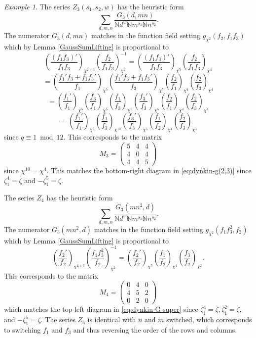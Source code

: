 \documentclass[11pt,letterpaper]{article}
\theoremstyle{definition}
\theoremstyle{remark}
\newtheorem{example}[theorem]{Example}
\numberwithin{equation}{section}
\theoremstyle{dotless}
\newcommand{\gene}{\zeta_1} %
\begin{document}
\begin{example}
The series $Z_3(s_1,s_2,w)$ has the heuristic form \[ \sum_{d,m,n} \frac{G_3(d,mn) }{ \mathbb N d^w \mathbb Nm^{s_1} \mathbb N n^{s_2} }.\] The numerator $G_3(d,mn)$ matches in the function field setting $g_{\chi^2} (f_2,f_1f_3)$ which by Lemma \ref{GaussSumLifting} is proportional to  \[\left( \frac{ (f_1f_3)'}{f_1f_3} \right)_{\chi^{2+3}}  \left( \frac{ f_2}{ f_1 f_3} \right)_{\chi^2}^{-1} =\left( \frac{ (f_1f_3)'}{f_1f_3} \right)_{\chi^{5}}  \left( \frac{ f_2}{ f_1 f_3} \right)_{\chi^4} \] 
\[=\left( \frac{ f_1' f_3 + f_1 f_3' }{f_1} \right)_{\chi^{5}} \left( \frac{ f_1' f_3 + f_1 f_3' }{f_3 } \right)_{\chi^{5}} \left( \frac{ f_2}{ f_1} \right)_{\chi^4} \left( \frac{ f_2}{  f_3} \right)_{\chi^4} \] 
\[= \left(\frac{f_1'}{f_1} \right)_{\chi^5}  \left(\frac{f_3}{f_1} \right)_{\chi^5}  \left(\frac{f_1}{f_3} \right)_{\chi^5}  \left(\frac{f_3'}{f_3} \right)_{\chi^5}  \left( \frac{ f_2}{ f_1} \right)_{\chi^4} \left( \frac{ f_2}{  f_3} \right)_{\chi^4}  \]
\[ = \left(\frac{f_1'}{f_1} \right)_{\chi^5}  \left(\frac{f_1}{f_3} \right)_{\chi^{10}}  \left(\frac{f_3'}{f_3} \right)_{\chi^5}  \left( \frac{ f_1}{ f_2} \right)_{\chi^4} \left( \frac{ f_2}{  f_3} \right)_{\chi^4} \] since $q \equiv 1\bmod 12$. This corresponds to the matrix 
\[ M_3 =\begin{pmatrix} 5 & 4 & 4 \\ 4 & 0 & 4 \\ 4 & 4 & 5 \end{pmatrix}\] since $\chi^{10}=\chi^4$. This matches the bottom-right diagram in \eqref{eq:dynkin-g(2,3)} since $\gene^4 = \overline{\zeta}$ and $-\gene^5=\zeta$. 

The series $Z_4$ \cite[(3.4)]{BrubakerThesis} has the heuristic form 
\[ \sum_{d,m,n} \frac{G_3(mn^2, d) }{ \mathbb N d^w \mathbb Nm^{s_1} \mathbb N n^{s_2} }.\] The numerator $G_3( mn^2,d)$ matches in the function field setting $g_{\chi^2} ( f_1 f_3^2, f_2)$ which by Lemma \ref{GaussSumLifting} is proportional to \[ \left( \frac{f_2'}{f_2}\right)_{\chi^{2+3}} \left( \frac{ f_1 f_3^2}{f_2} \right)_{\chi^2}^{-1} = \left( \frac{f_2'}{f_2}\right)_{\chi^{5}} \left( \frac{ f_1 }{f_2} \right)_{\chi^4}\left( \frac{ f_3 }{f_2} \right)_{\chi^2} .\]
This corresponds to the matrix \[ M_4 =\begin{pmatrix} 0 & 4 & 0 \\ 4 & 5 & 2 \\ 0 & 2 & 0 \end{pmatrix}\] which matches the top-left diagram in \eqref{eq:dynkin-G-super} since $\gene^4=\overline{\zeta}, \gene^2=\zeta$, and $-\gene^5= \zeta$. The series $Z_5$ is identical with $n$ and $m$ switched, which corresponds to switching $f_1$ and $f_3$ and thus reversing the order of the rows and columns.


\end{example}
\end{document}
